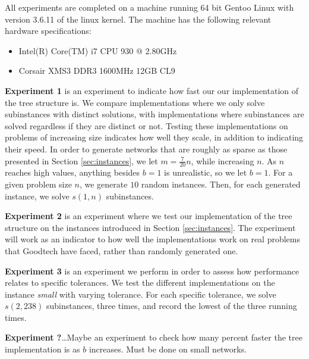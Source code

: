 All experiments are completed on a machine running 64 bit Gentoo Linux
with version 3.6.11 of the linux kernel. The machine has the following
relevant hardware specifications:
\begin{itemize}
    \item Intel(R) Core(TM) i7 CPU 930 @ 2.80GHz
    \item Corsair XMS3 DDR3 1600MHz 12GB CL9
\end{itemize}

\textbf{Experiment 1} is an experiment to indicate how fast our
our implementation of the tree structure is. We compare implementations where
we only solve subinstances with distinct solutions, with implementations where
subinstances are solved regardless if they are distinct or not. Testing these
implementations on problems of increasing size indicates how well they scale,
in addition to indicating their speed.
In order to generate networks that are roughly as sparse as those
presented in Section \ref{sec:instances}, we let $m = \frac{7}{20}n$, while
increasing $n$. As $n$ reaches high values, anything besides $b = 1$ is
unrealistic, so we let $b = 1$.
For a given problem size $n$, we generate $10$ random instances. Then,
for each generated instance, we solve $s(1, n)$ subinstances.

\textbf{Experiment 2} is an experiment where we test our implementation of the
tree structure on the instances introduced in Section \ref{sec:instances}.
The experiment will work as an indicator to how well the implementations work
on real problems that Goodtech have faced, rather than randomly generated one.

\textbf{Experiment 3} is an experiment we perform in order to assess
how performance relates to specific tolerances. We test the different
implementations on the instance \textit{small} with varying tolerance.
For each specific tolerance, we solve $s(2, 238)$ subinstances, three times,
and record the lowest of the three running times.

\textbf{Experiment ?}\ldots Maybe an experiment to check how many percent
faster the tree implementation is as $b$ increases. Must be done on small
networks.
